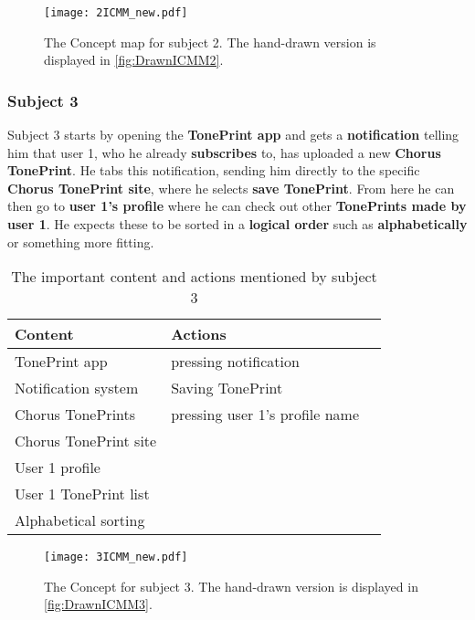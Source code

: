%
\begin{figure}[H]
	\centering
	\texttt{[image: 2ICMM\_new.pdf]}
	\caption{The Concept map for subject 2. The hand-drawn version is displayed in \autoref{fig:DrawnICMM2}.}
	\label{fig:ICMM2}
\end{figure}


\subsubsection{Subject 3}
\label{Subject3}
Subject 3 starts by opening the \textbf{TonePrint app} and gets a \textbf{notification} telling him that user 1, who he already \textbf{subscribes} to, has uploaded a new \textbf{Chorus TonePrint}. He tabs this notification, sending him directly to the specific \textbf{Chorus TonePrint site}, where he selects \textbf{save TonePrint}. From here he can then go to \textbf{user 1's profile} where he can check out other \textbf{TonePrints made by user 1}. He expects these to be sorted in a \textbf{logical order} such as \textbf{alphabetically} or something more fitting. \\
%
\begin{table}[H]
\begin{minipage}[b]{\linewidth}\centering
	\begin{tabular} {|l|l|l|} \hline
		\rowcolor{xGray25} \textbf{Content} & \textbf{Actions} \\  \hline
		TonePrint app & pressing notification \\
		Notification system & Saving TonePrint \\
		Chorus TonePrints & pressing user 1's profile name \\
		Chorus TonePrint site &  \\
		User 1 profile &  \\
		User 1 TonePrint list &  \\
		Alphabetical sorting &  \\ \hline
	\end{tabular}
	\caption{The important content and actions mentioned by subject 3}
	\label{tab:Subject3ContentActions}
\end{minipage}
\end{table}
%
\begin{figure}[H]
	\centering
	\texttt{[image: 3ICMM\_new.pdf]}
	\caption{The Concept for subject 3. The hand-drawn version is displayed in \autoref{fig:DrawnICMM3}.}
	\label{fig:ICMM3}
\end{figure}


